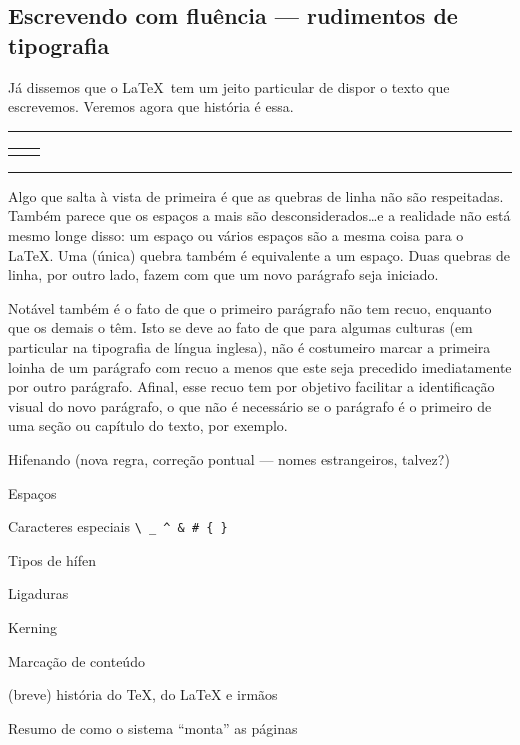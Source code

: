 \subsection{Escrevendo com fluência --- rudimentos de tipografia}

Já dissemos que o \LaTeX\ tem um jeito particular de dispor o texto
que escrevemos. Veremos agora que história é essa.

\noindent\begin{minipage}{\textwidth}
\begin{center}\footnotesize\hrule\smallskip
\begin{tabular}{c|c}
\begin{minipage}{.48\textwidth}

\end{minipage} &
\begin{minipage}{.48\textwidth}

\end{minipage}
\end{tabular}
\smallskip\hrule
\end{center}
\end{minipage}

Algo que salta à vista de primeira é que as quebras de linha não são
respeitadas. Também parece que os espaços a mais são
desconsiderados\dots e a realidade não está mesmo longe disso: um
espaço ou vários espaços são a mesma coisa para o \LaTeX. Uma (única)
quebra também é equivalente a um espaço. Duas quebras de linha, por
outro lado, fazem com que um novo parágrafo seja iniciado.

Notável também é o fato de que o primeiro
parágrafo não tem recuo, enquanto que os
demais o têm. Isto se deve ao fato de que para algumas culturas (em
particular na tipografia de língua inglesa), não é costumeiro marcar a
primeira loinha de um parágrafo com recuo a menos que este seja
precedido imediatamente por outro parágrafo. Afinal, esse recuo tem
por objetivo facilitar a identificação visual do novo parágrafo, o que
não é necessário se o parágrafo é o primeiro de uma seção ou capítulo
do texto, por exemplo.

Hifenando (nova regra, correção pontual --- nomes estrangeiros,
talvez?)

Espaços

Caracteres especiais \verb!\ _ ^ & # { }!

Tipos de hífen

Ligaduras

Kerning

Marcação de conteúdo

(breve) história do TeX, do LaTeX e irmãos

Resumo de como o sistema ``monta'' as páginas

